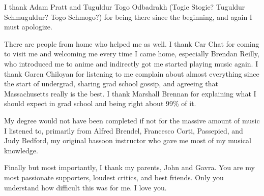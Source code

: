 \documentclass[%
  class = article,%
  crop = false,%
  float = true,%
  multi = true,%
  preview = false,%
]{standalone}
\begin{document}
I thank Adam Pratt and Tuguldur Togo Odbadrakh (Togie Stogie? Tuguldur Schmuguldur? Togo Schmogo?) for being there since the beginning, and again I must apologize.

There are people from home who helped me as well. I thank Car Chat for coming to visit me and welcoming me every time I came home, especially Brendan Reilly, who introduced me to anime and indirectly got me started playing music again. I thank Garen Chiloyan for listening to me complain about almost everything since the start of undergrad, sharing grad school gossip, and agreeing that Massachusetts really is the best. I thank Marshall Brennan for explaining what I should expect in grad school and being right about 99\% of it.

My degree would not have been completed if not for the massive amount of music I listened to, primarily from Alfred Brendel, Francesco Corti, Passepied, and Judy Bedford, my original bassoon instructor who gave me most of my musical knowledge.

Finally but most importantly, I thank my parents, John and Gavra. You are my most passionate supporters, loudest critics, and best friends. Only you understand how difficult this was for me. I love you.
\end{document}
